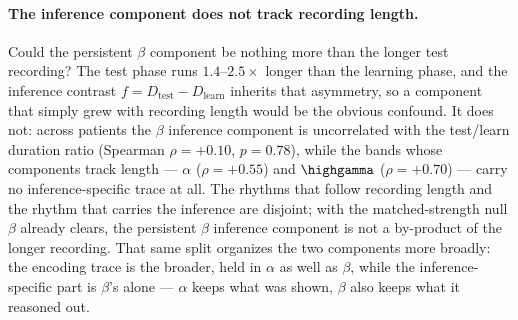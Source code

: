 \paragraph{The inference component does not track recording length.}
Could the persistent \(\beta\) component be nothing more than the longer test recording? The test phase runs \(1.4\)--\(2.5\times\) longer than the learning phase, and the inference contrast \(f = D_{\mathrm{test}} - D_{\mathrm{learn}}\) inherits that asymmetry, so a component that simply grew with recording length would be the obvious confound. It does not: across patients the \(\beta\) inference component is uncorrelated with the test/learn duration ratio (Spearman \(\rho = {+}0.10\), \(p = 0.78\)), while the bands whose components track length --- \(\alpha\) (\(\rho = {+}0.55\)) and \(\highgamma\) (\(\rho = {+}0.70\)) --- carry no inference-specific trace at all. The rhythms that follow recording length and the rhythm that carries the inference are disjoint; with the matched-strength null \(\beta\) already clears, the persistent \(\beta\) inference component is not a by-product of the longer recording. That same split organizes the two components more broadly: the encoding trace is the broader, held in \(\alpha\) as well as \(\beta\), while the inference-specific part is \(\beta\)'s alone --- \(\alpha\) keeps what was shown, \(\beta\) also keeps what it reasoned out.
